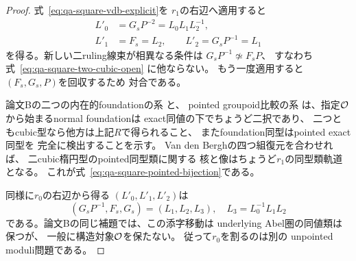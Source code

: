 \begin{proof}
式~\eqref{eq:qa-square-vdb-explicit}を
$r_1$の右辺へ適用すると
\[
 \begin{aligned}
 L'_0&=G_sP^{-2}
       =L_0L_1L_2^{-1},\\
 L'_1&=F_s=L_2,\qquad
 L'_2=G_sP^{-1}=L_1
 \end{aligned}
\]
を得る。新しい二ruling線束が相異なる条件は
$G_sP^{-1}\not\simeq F_sP$、
すなわち式~\eqref{eq:qa-square-two-cubic-open}
に他ならない。
もう一度適用すると$(F_s,G_s,P)$を回収するため
対合である。

論文Bの二つの内在的foundationの系
\cite[\texttt{cor:two-intrinsic-foundations}]{QuadricModuli2026}と、
pointed groupoid比較の系
\cite[\texttt{cor:h2-point-groupoid-foundation}]{QuadricModuli2026}は、指定$\mathcal O$から始まるnormal foundationは
exact同値の下でちょうど二択であり、
二つともcubic型なら他方は上記$R$で得られること、
またfoundation同型はpointed exact同型を
完全に検出することを示す。
Van den Berghの四つ組復元を合わせれば、
二cubic楕円型のpointed同型類に関する
核と像はちょうど$r_1$の同型類軌道となる。
これが式~\eqref{eq:qa-square-pointed-bijection}である。

同様に$r_0$の右辺から得る
$(L'_0,L'_1,L'_2)$は
\[
 (G_sP^{-1},F_s,G_s)=(L_1,L_2,L_3),
 \quad L_3=L_0^{-1}L_1L_2
\]
である。論文Bの同じ補題では、この添字移動は
underlying Abel圏の同値類は保つが、
一般に構造対象$\mathcal O$を保たない。
従って$r_0$を割るのは別の
unpointed moduli問題である。
\end{proof}

